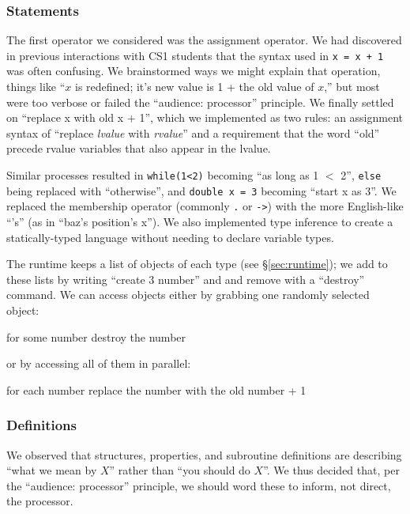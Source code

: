 \documentclass{sig-alternate}
\newcommand{\INDSTATE}[1][1]{\STATE\hspace{#1\algorithmicindent}}
\newenvironment{snippet}{\begin{algorithmic}[1]\sf}{\end{algorithmic}}
\newcommand{\code}[1]{``\textsf{#1}''}
\begin{document}
\subsubsection{Statements}
The first operator we considered was the assignment operator.
We had discovered in previous interactions with CS1 students
that the syntax used in \texttt{x = x + 1} was often confusing.
We brainstormed ways we might explain that operation,
things like ``$x$ is redefined; it's new value is 1 + the old value of $x$,''
but most were too verbose or failed the ``audience: processor'' principle.
We finally settled on \code{replace x with old x + 1},
which we implemented as two rules:
an assignment syntax of \code{replace {\it lvalue} with {\it rvalue}}
and a requirement that the word \code{old} precede rvalue variables that also appear in the lvalue.

Similar processes resulted in 
\texttt{while(1<2)} becoming \code{as long as 1 $<$ 2},
\texttt{else} being replaced with \code{otherwise}, 
and \texttt{double x = 3} becoming \code{start x as 3}.
We replaced the membership operator (commonly \texttt{.} or \mbox{\texttt{->}})
with the more English-like \code{'s} (as in \code{baz's position's x}).
We also implemented type inference to create a statically-typed language 
without needing to declare variable types.

The runtime keeps a list of objects of each type (see \S\ref{sec:runtime});
we add to these lists by writing \code{create 3 number} and and remove with a \code{destroy} command.
We can access objects either by grabbing one randomly selected object:
\begin{snippet}
\STATE for some number
\INDSTATE destroy the number
\end{snippet}
or by accessing all of them in parallel:
\begin{snippet}
\STATE for each number
\INDSTATE replace the number with the old number + 1
\end{snippet}

\subsubsection{Definitions}
We observed that structures, properties, and subroutine definitions
are describing ``what we mean by $X$'' rather than ``you should do $X$''.
We thus decided that, per the ``audience: processor'' principle, 
we should word these to inform, not direct, the processor.
\end{document}

